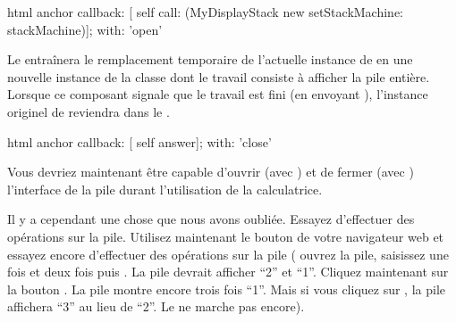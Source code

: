 \documentclass[a4paper,10pt,twoside]{book}
\begin{document}

\begin{code}{}
html anchor
	callback: [ self call: (MyDisplayStack new setStackMachine: stackMachine)];
	with: 'open'
\end{code}

Le \callback{} entraînera le remplacement temporaire de l'actuelle
instance de  en une nouvelle instance de la classe
 dont le travail consiste à afficher la pile
entière.
Lorsque ce composant signale que le travail est fini (en envoyant
), l'instance originel de  reviendra
dans le .



\begin{code}{}
html anchor
	callback: [ self answer];
	with: 'close'
\end{code}

Vous devriez maintenant être capable d'ouvrir (avec ) et de
fermer (avec ) l'interface  de la pile durant
l'utilisation de la calculatrice.

Il y a cependant une chose que nous avons oubliée.
Essayez d'effectuer des opérations sur la pile.
Utilisez maintenant le bouton \backbtn{} de votre navigateur web et
essayez encore d'effectuer des opérations sur la pile (\parex
ouvrez la pile, saisissez  une fois et  deux fois
puis \menu{+}. La pile devrait afficher ``2'' et ``1''. Cliquez
maintenant sur la bouton \backbtn. La pile montre encore trois fois
``1''. Mais si vous cliquez sur \menu{+}, la pile affichera ``3''
au lieu de ``2''. Le \backtracking{} ne marche pas encore).
\end{document}
